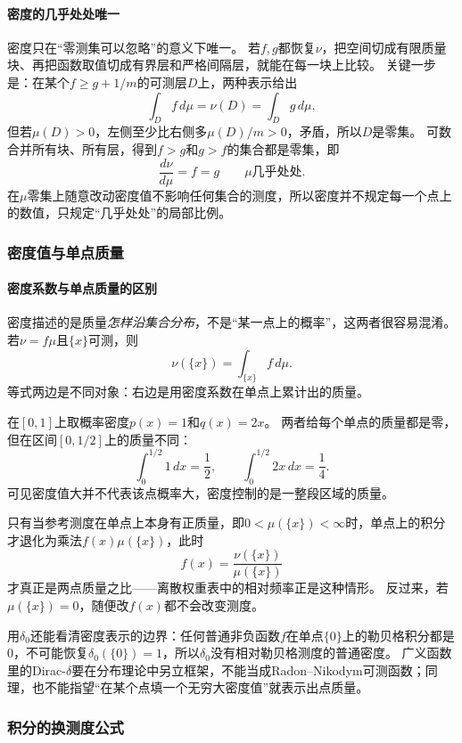 \paragraph{密度的几乎处处唯一}

密度只在“零测集可以忽略”的意义下唯一。
若$f,g$都恢复$\nu$，把空间切成有限质量块、再把函数取值切成有界层和严格间隔层，就能在每一块上比较。
关键一步是：在某个$f\geq g+1/m$的可测层$D$上，两种表示给出
\[
 \int_Df\,d\mu=\nu(D)=\int_Dg\,d\mu,
\]
但若$\mu(D)>0$，左侧至少比右侧多$\mu(D)/m>0$，矛盾，所以$D$是零集。
可数合并所有块、所有层，得到$f>g$和$g>f$的集合都是零集，即
\[
 \frac{d\nu}{d\mu}=f=g\qquad\mu\text{几乎处处}.
\]
在$\mu$零集上随意改动密度值不影响任何集合的测度，所以密度并不规定每一个点上的数值，只规定“几乎处处”的局部比例。

\subsubsection{密度值与单点质量}

\paragraph{密度系数与单点质量的区别}

密度描述的是质量\emph{怎样沿集合分布}，不是“某一点上的概率”，这两者很容易混淆。
若$\nu=f\mu$且$\{x\}$可测，则
\[
 \nu(\{x\})=\int_{\{x\}}f\,d\mu.
\]
等式两边是不同对象：右边是用密度系数在单点上累计出的质量。

在$[0,1]$上取概率密度$p(x)=1$和$q(x)=2x$。
两者给每个单点的质量都是零，但在区间$[0,1/2]$上的质量不同：
\[
 \int_0^{1/2}1\,dx=\frac12,\qquad
 \int_0^{1/2}2x\,dx=\frac14.
\]
可见密度值大并不代表该点概率大，密度控制的是一整段区域的质量。

只有当参考测度在单点上本身有正质量，即$0<\mu(\{x\})<\infty$时，单点上的积分才退化为乘法$f(x)\mu(\{x\})$，此时
\[
 f(x)=\frac{\nu(\{x\})}{\mu(\{x\})}
\]
才真正是两点质量之比——离散权重表中的相对频率正是这种情形。
反过来，若$\mu(\{x\})=0$，随便改$f(x)$都不会改变测度。

用$\delta_0$还能看清密度表示的边界：任何普通非负函数$f$在单点$\{0\}$上的勒贝格积分都是$0$，不可能恢复$\delta_0(\{0\})=1$，所以$\delta_0$没有相对勒贝格测度的普通密度。
广义函数里的Dirac-$\delta$要在分布理论中另立框架，不能当成Radon–Nikodym可测函数；同理，也不能指望“在某个点填一个无穷大密度值”就表示出点质量。

\subsubsection{积分的换测度公式}

